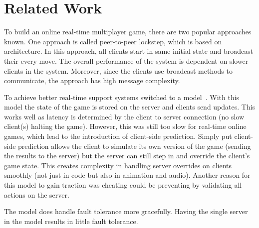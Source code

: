 
\section{Related Work}


To build an online real-time multiplayer game, there are two popular approaches known. One approach is called peer-to-peer lockstep, which is based on \ptoP architecture. In this approach, all clients start in same initial state and broadcast their every move. The overall performance of the system is dependent on slower clients in the system. Moreover, since the clients use broadcast methods to communicate, the approach has high message complexity.

To achieve better real-time support systems switched to a \clientServer model~\cite{DOOMfaq}. With this model the state of the game is stored on the server and clients send updates. This works well as latency is determined by the client to server connection (no slow client(s) halting the game). However, this was still too slow for real-time online games, which lead to the introduction of client-side prediction. Simply put client-side prediction allows the client to simulate its own version of the game (sending the results to the server) but the server can still step in and override the client's game state. This creates complexity in handling server overrides on clients smoothly (not just in code but also in animation and audio). Another reason for this model to gain traction was cheating could be preventing by validating all actions on the server.

The \ptoP model does handle fault tolerance more gracefully. Having the single server in the \clientServer model results in little fault tolerance.
